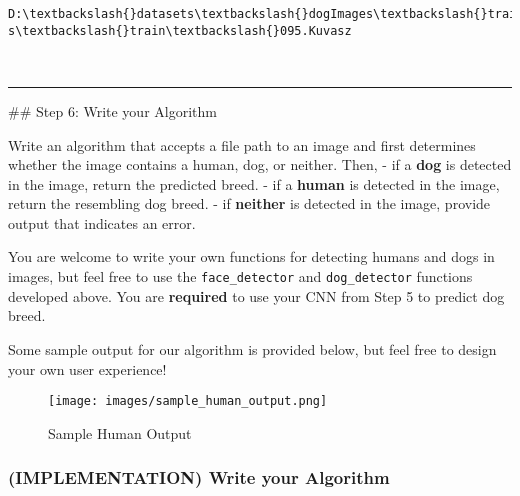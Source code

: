 \documentclass[11pt]{article}
\makeatletter
\def\maxwidth{\ifdim\Gin@nat@width>\linewidth\linewidth
    \else\Gin@nat@width\fi}
\let\Oldincludegraphics\includegraphics
\renewcommand{\includegraphics}[1]{\Oldincludegraphics[width=.8\maxwidth]{#1}}
\makeatother
\begin{document}
    \begin{Verbatim}[commandchars=\\\{\}]
D:\textbackslash{}datasets\textbackslash{}dogImages\textbackslash{}train\textbackslash{}095.Kuvasz\textbackslash{}Kuvasz\_06442.jpg
s\textbackslash{}train\textbackslash{}095.Kuvasz

    \end{Verbatim}

    \begin{center}
    \end{center}
    { \hspace*{\fill} \\}
    
    \begin{center}\rule{0.5\linewidth}{\linethickness}\end{center}

 \#\# Step 6: Write your Algorithm

Write an algorithm that accepts a file path to an image and first
determines whether the image contains a human, dog, or neither. Then, -
if a \textbf{dog} is detected in the image, return the predicted breed.
- if a \textbf{human} is detected in the image, return the resembling
dog breed. - if \textbf{neither} is detected in the image, provide
output that indicates an error.

You are welcome to write your own functions for detecting humans and
dogs in images, but feel free to use the \texttt{face\_detector} and
\texttt{dog\_detector} functions developed above. You are
\textbf{required} to use your CNN from Step 5 to predict dog breed.

Some sample output for our algorithm is provided below, but feel free to
design your own user experience!

\begin{figure}
\centering
\texttt{[image: images/sample\_human\_output.png]}
\caption{Sample Human Output}
\end{figure}

\subsubsection{(IMPLEMENTATION) Write your
Algorithm}\label{implementation-write-your-algorithm}
\end{document}

